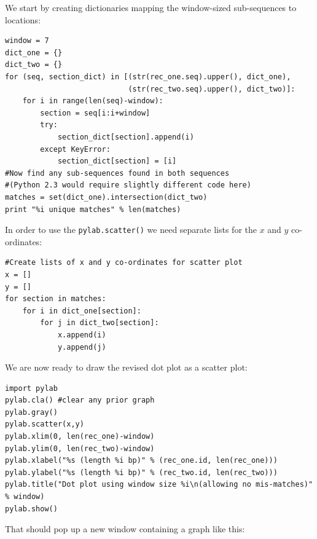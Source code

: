 \documentclass{report}
\begin{document}
We start by creating dictionaries mapping the window-sized sub-sequences to locations:
\begin{verbatim}
window = 7
dict_one = {}
dict_two = {}
for (seq, section_dict) in [(str(rec_one.seq).upper(), dict_one),
                            (str(rec_two.seq).upper(), dict_two)]:
    for i in range(len(seq)-window):
        section = seq[i:i+window]
        try:
            section_dict[section].append(i)
        except KeyError:
            section_dict[section] = [i]
#Now find any sub-sequences found in both sequences
#(Python 2.3 would require slightly different code here)
matches = set(dict_one).intersection(dict_two)
print "%i unique matches" % len(matches)
\end{verbatim}
\noindent In order to use the \verb|pylab.scatter()| we need separate lists for the $x$ and $y$ co-ordinates:
\begin{verbatim}
#Create lists of x and y co-ordinates for scatter plot
x = []
y = []
for section in matches:
    for i in dict_one[section]:
        for j in dict_two[section]:
            x.append(i)
            y.append(j)
\end{verbatim}
\noindent We are now ready to draw the revised dot plot as a scatter plot:
\begin{verbatim}
import pylab
pylab.cla() #clear any prior graph
pylab.gray()
pylab.scatter(x,y)
pylab.xlim(0, len(rec_one)-window)
pylab.ylim(0, len(rec_two)-window)
pylab.xlabel("%s (length %i bp)" % (rec_one.id, len(rec_one)))
pylab.ylabel("%s (length %i bp)" % (rec_two.id, len(rec_two)))
pylab.title("Dot plot using window size %i\n(allowing no mis-matches)" % window)
pylab.show()
\end{verbatim}
%
%
\begin{htmlonly}
\noindent That should pop up a new window containing a graph like this:


\end{htmlonly}
\end{document}
